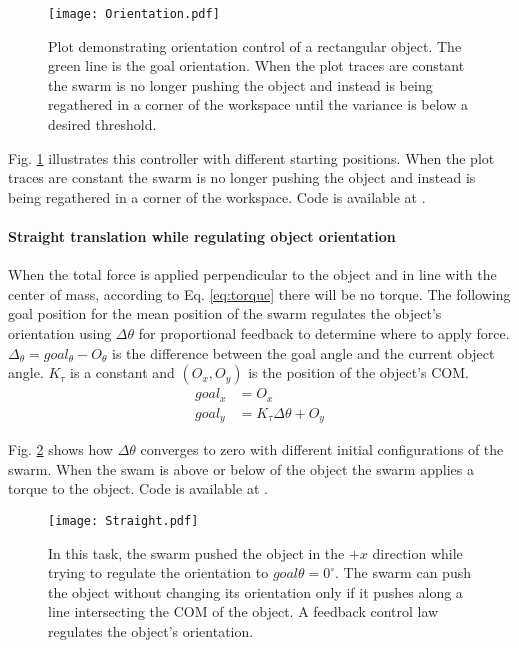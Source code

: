 \begin{figure}
\begin{center}
	\texttt{[image: Orientation.pdf]}
\end{center}
\vspace{-1em}
\caption{\label{fig:OrientCont}
Plot demonstrating  orientation control of a rectangular object. The green line is the goal orientation.   When the plot traces are constant the swarm is no longer pushing the object and instead is being regathered in a corner of the workspace until the variance is below a desired threshold. 
}
\vspace{-1em}
\end{figure}

Fig. \ref{fig:OrientCont} illustrates this controller with different starting positions. When the plot traces are constant the swarm is no longer pushing the object and instead is being regathered in a corner of the workspace. Code is available at \cite{Shahrokhi16Orient}.

\paragraph{Straight translation while regulating object orientation} \label{para:PureTranslation}

When the total force is applied perpendicular to the object and in line with the center of mass, according to Eq. \eqref{eq:torque} there will be no torque. 
The following goal position for the mean position of the swarm regulates the object's orientation using $\Delta \theta$ for proportional feedback  to determine where to apply force.
$\Delta_\theta = goal_\theta - O_\theta$ is the difference between the goal angle and the current object angle.
 $K_\tau$ is a constant and $(O_x,O_y)$ is the position of the object's COM.
\begin{align}
goal_x &= O_x \nonumber \\
goal_y &= K_\tau \Delta\theta + O_y  \label{eq:TranslationAndOrientation}
\end{align}

 Fig. \ref{fig:Straight} shows how $\Delta \theta$ converges to zero with different initial configurations of the swarm. When the swam is above or below of the object the swarm applies a torque to the object. Code is available at \cite{Shahrokhi16translation}.
 
 
\begin{figure}
\begin{center}
	\texttt{[image: Straight.pdf]}
\end{center}
\vspace{-1em}
\caption{\label{fig:Straight}
In this task, the swarm pushed the object in the $+x$ direction while trying to regulate the orientation to $goal\theta = 0^\circ$.
 The swarm can push the object without changing its orientation only if it pushes along a line intersecting the COM of the object.  A feedback control law regulates the object's orientation.
}
\vspace{-1em}
\end{figure}


